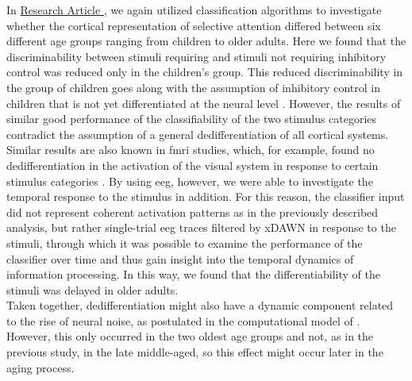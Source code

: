 In \hyperref[results:paperII]{Research Article }, we again utilized classification algorithms to investigate whether the cortical representation of selective attention differed between six different age groups ranging from children to older adults. Here we found that the discriminability between stimuli requiring and stimuli not requiring inhibitory control was reduced only in the children's group. This reduced discriminability in the group of children goes along with the assumption of inhibitory control in children that is not yet differentiated at the neural level \cite{Waszak2010, Reuter2019}. However, the results of similar good performance of the classifiability of the two stimulus categories contradict the assumption of a general dedifferentiation of all cortical systems. Similar results are also known in \gls{fmri} studies, which, for example, found no dedifferentiation in the activation of the visual system in response to certain stimulus categories \cite{Voss2008}. By using \gls{eeg}, however, we were able to investigate the temporal response to the stimulus in addition. For this reason, the classifier input did not represent coherent activation patterns as in the previously described analysis, but rather single-trial \gls{eeg} traces filtered by xDAWN in response to the stimuli, through which it was possible to examine the performance of the classifier over time and thus gain insight into the temporal dynamics of information processing. In this way, we found that the differentiability of the stimuli was delayed in older adults.\\
Taken together, dedifferentiation might also have a dynamic component related to the rise of neural noise, as postulated in the computational model of \citeauthor{Li2001} \cite{Li2001, Li2000}. However, this only occurred in the two oldest age groups and not, as in the previous study, in the late middle-aged, so this effect might occur later in the aging process.

